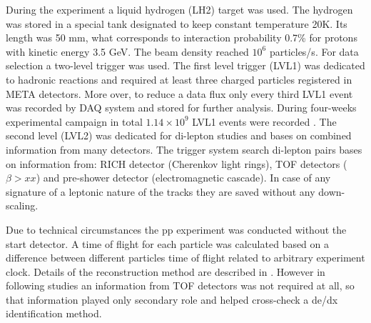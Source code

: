 During the experiment a liquid hydrogen (LH2) target was used. The hydrogen was stored in a special tank designated to keep constant temperature 20K. Its length was 50 mm, what corresponds to interaction probability 0.7\% for protons with kinetic energy 3.5 GeV. The beam density reached $10^6$ particles/s. For data selection a two-level trigger was used. The first level trigger (LVL1) was dedicated to hadronic reactions and required at least three charged particles registered in META detectors. More over, to reduce a data flux only every third LVL1 event was recorded by DAQ system and stored for further analysis. During four-weeks experimental campaign in total $1.14 \times 10^9$ LVL1 events were recorded \cite{hades_inclL_35}. The second level (LVL2) was dedicated for di-lepton studies and bases on combined information from many detectors. The trigger system search di-lepton pairs bases on information from: RICH detector (Cherenkov light rings), TOF detectors ($\beta>xx$) and pre-shower detector (electromagnetic cascade)\cite{Agakishiev:2009am,hades_DAQ}. In case of any signature of a leptonic nature of the tracks they are saved without any down-scaling.

Due to technical circumstances the pp experiment was conducted without the start detector. A time of flight for each particle was calculated based on a difference between different particles time of flight related to arbitrary experiment clock. Details of the reconstruction method are described in \cite{dybczak_phd}. However in following studies an information from TOF detectors was not required at all, so that information played only secondary role and helped cross-check a de/dx identification method.
